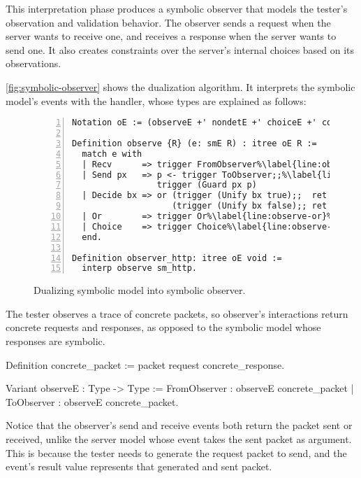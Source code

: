 This interpretation phase produces a symbolic observer that models the tester's
observation and validation behavior.  The observer sends a request when the
server wants to receive one, and receives a response when the server wants to
send one.  It also creates constraints over the server's internal choices based
on its observations.

\autoref{fig:symbolic-observer} shows the dualization algorithm.  It interprets
the symbolic model's events with the  handler, whose types are
explained as follows:

\begin{figure}
\begin{lstlisting}[numbers=left]
Notation oE := (observeE +' nondetE +' choiceE +' constraintE).

Definition observe {R} (e: smE R) : itree oE R :=
  match e with
  | Recv      => trigger FromObserver%\label{line:observe-absorb}%
  | Send px   => p <- trigger ToObserver;;%\label{line:observe-emit}%
                 trigger (Guard px p)
  | Decide bx => or (trigger (Unify bx true);;  ret true)%\label{line:observe-branch}%
                    (trigger (Unify bx false);; ret false)
  | Or        => trigger Or%\label{line:observe-or}%
  | Choice    => trigger Choice%\label{line:observe-choice}%
  end.

Definition observer_http: itree oE void :=
  interp observe sm_http.
\end{lstlisting}
\caption{Dualizing symbolic model into symbolic observer.}
\label{fig:symbolic-observer}
\end{figure}

The tester observes a trace of concrete packets, so observer's interactions
return concrete requests and responses, as opposed to the symbolic model whose
responses are symbolic.
\begin{coq}
  Definition concrete_packet := packet request concrete_response.

  Variant observeE : Type -> Type :=
    FromObserver   : observeE concrete_packet
  | ToObserver     : observeE concrete_packet.
\end{coq}

Notice that the observer's send and receive events both return the packet sent
or received, unlike the server model whose  event takes the sent
packet as argument.  This is because the tester needs to generate the request
packet to send, and the event's result value represents that generated and sent
packet.

